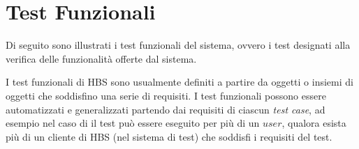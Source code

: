 
\section{Test Funzionali}

Di seguito sono illustrati i test funzionali del sistema, ovvero i test designati alla verifica delle funzionalità offerte dal sistema.

I test funzionali di HBS sono usualmente definiti a partire da oggetti o insiemi di oggetti che soddisfino una serie di requisiti.
I test funzionali possono essere automatizzati e generalizzati partendo dai requisiti di ciascun \emph{test case}, ad esempio nel caso di \idtpVERSAL il test pu\`o essere eseguito per pi\`u di un $user$, qualora esista pi\`u di un cliente di HBS (nel sistema di test) che soddisfi i requisiti del test.



